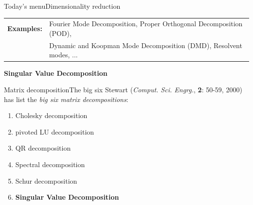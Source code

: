 \documentclass[usenames,dvipsnames,svgnames,10pt,aspectratio=169]{beamer}
\begin{document}
\begin{frame}[t, c]{Today's menu}{Dimensionality reduction}
	\bigskip

	\begin{tabular}{ll}
		\textbf{Examples:} & Fourier Mode Decomposition, Proper Orthogonal Decomposition (POD), \\
		~                  & Dynamic and Koopman Mode Decomposition (DMD), Resolvent modes, ...
	\end{tabular}

	\vspace{1cm}
\end{frame}

\begin{frame}[t, c]{}
	\centering
	\vspace{1cm}

	{\Large \textbf{Singular Value Decomposition}}

	\bigskip

	{}

\end{frame}

\begin{frame}[t, c]{Matrix decomposition}{The big six}
	Stewart (\emph{Comput. Sci. Engrg.}, \textbf{2}: 50-59, 2000) has list the \emph{big six matrix decompositions}:
	\begin{enumerate}
		\item Cholesky decomposition
		\item pivoted LU decomposition
		\item QR decomposition
		\item Spectral decomposition
		\item Schur decomposition
		\item \alert{\textbf{Singular Value Decomposition}}
	\end{enumerate}
	\vspace{1cm}
\end{frame}
\end{document}
